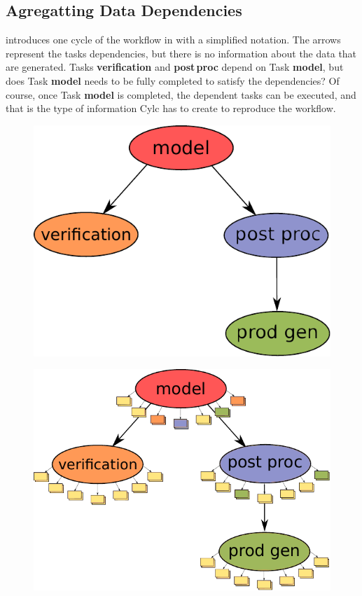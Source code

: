 \documentclass{superfri}
\begin{document}
\subsection{Agregatting Data Dependencies}

 introduces one cycle of the workflow in  with a simplified notation. The arrows represent the tasks dependencies, but there is no information about the data that are generated. Tasks \textbf{verification} and \textbf{post\,proc} depend on Task \textbf{model}, but does Task \textbf{model} needs to be fully completed to satisfy the dependencies?
Of course, once Task \textbf{model} is completed, the dependent tasks can be executed, and that is the type of information Cylc has to create to reproduce the workflow.

\begin{figure}[b]
    \begin{minipage}{.45\linewidth}
        \centering
        \includegraphics[width=0.9\linewidth]{pic/cycle1}
        \label{fig:cycle1}
    \end{minipage}
    \begin{minipage}{.45\linewidth}
        \centering
        \includegraphics[width=0.9\linewidth]{pic/cycle-io-dep}

\end{minipage}
\end{figure}
\end{document}
